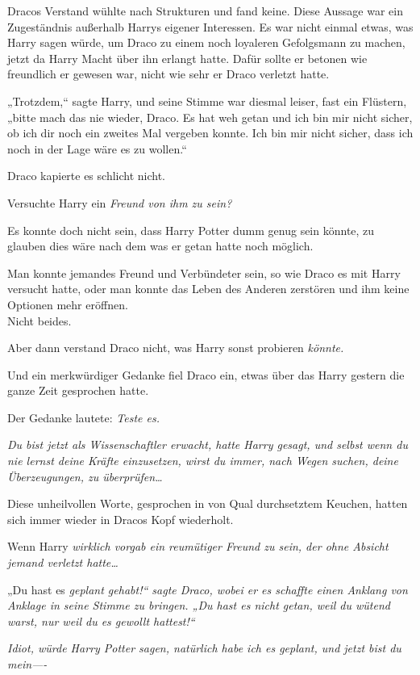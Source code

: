 {Dracos Verstand wühlte nach Strukturen und fand keine. Diese Aussage war ein Zugeständnis außerhalb Harrys eigener Interessen. Es war nicht einmal etwas, was Harry sagen würde, um Draco zu einem noch loyaleren Gefolgsmann zu machen, jetzt da Harry Macht über ihn erlangt hatte. Dafür sollte er betonen wie freundlich er gewesen war, nicht wie sehr er Draco verletzt hatte.

„Trotzdem,“ sagte Harry, und seine Stimme war diesmal leiser, fast ein Flüstern, „bitte mach das nie wieder, Draco. Es hat weh getan und ich bin mir nicht sicher, ob ich dir noch ein zweites Mal vergeben konnte. Ich bin mir nicht sicher, dass ich noch in der Lage wäre es zu wollen.“

Draco kapierte es schlicht nicht.

Versuchte Harry ein \emph{Freund von ihm zu sein?}

Es konnte doch nicht sein, dass Harry Potter dumm genug sein könnte, zu glauben dies wäre nach dem was er getan hatte noch möglich.

Man konnte jemandes Freund und Verbündeter sein, so wie Draco es mit Harry versucht hatte, oder man konnte das Leben des Anderen zerstören und ihm keine Optionen mehr eröffnen.\\ Nicht beides.

Aber dann verstand Draco nicht, was Harry sonst probieren \emph{könnte.}

Und ein merkwürdiger Gedanke fiel Draco ein, etwas über das Harry gestern die ganze Zeit gesprochen hatte.

Der Gedanke lautete: \emph{Teste es.}

\emph{Du bist jetzt als Wissenschaftler erwacht, hatte Harry gesagt, \emph{und selbst wenn du nie lernst deine Kräfte einzusetzen, wirst du immer, nach Wegen suchen, deine Überzeugungen, zu überprüfen…}}

Diese unheilvollen Worte, gesprochen in von Qual durchsetztem Keuchen, hatten sich immer wieder in Dracos Kopf wiederholt.

Wenn Harry \emph{wirklich vorgab ein reumütiger Freund zu sein, der ohne Absicht jemand verletzt hatte…}

„Du hast es \emph{geplant gehabt!“ sagte Draco, wobei er es schaffte einen Anklang von Anklage in seine Stimme zu bringen. „Du hast es nicht getan, weil du wütend warst, nur weil du es \emph{gewollt} hattest!“}

\emph{Idiot, würde Harry Potter sagen, natürlich habe ich es geplant, und jetzt bist du mein----}

}

